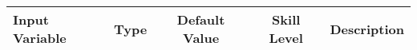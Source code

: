 \documentclass[letterpaper,10pt]{article}
\newcommand{\headersize}[1]{\large\textbf{#1}}
\newlength{\colEwidth}
\begin{document}
 \setlength{\abovedisplayskip}{4pt}
 \setlength{\belowdisplayskip}{4pt}

    \begin{longtable}{ | l | c | c | c | p{\colEwidth} | }
    \hline
    \rule{0pt}{5mm}
    \headersize{Input Variable} &
    \headersize{Type} &
    \headersize{Default Value} &
    \headersize{Skill Level} &
    \headersize{Description} \\ \hline


\end{longtable}
\end{document}
